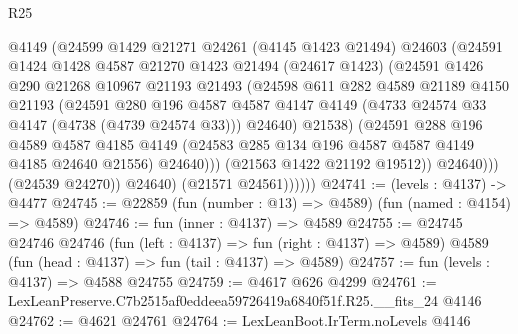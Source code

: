 \begin{lexlean}{R25}
\begin{coremodule}
                        @4149
                        (@24599
                          @1429
                          @21271
                          @24261
                          (@4145 @1423 @21494)
                          @24603
                          (@24591
                            @1424
                            @1428
                            @4587
                            @21270
                            @1423
                            @21494
                            (@24617 @1423)
                            (@24591
                              @1426
                              @290
                              @21268
                              @10967
                              @21193
                              @21493
                              (@24598
                                @611
                                @282
                                @4589
                                @21189
                                @4150
                                @21193
                                (@24591
                                  @280
                                  @196
                                  @4587
                                  @4587
                                  @4147
                                  @4149
                                  (@4733 @24574 @33 @4147 (@4738 (@4739 @24574 @33)))
                                  @24640)
                                @21538)
                              (@24591
                                @288
                                @196
                                @4589
                                @4587
                                @4185
                                @4149
                                (@24583 @285 @134 @196 @4587 @4587 @4149 @4185 @24640 @21556)
                                @24640)))
                          (@21563 @1422 @21192 @19512))
                        @24640)))
                  (@24539 @24270))
                @24640)
              (@21571 @24561))))))
@24741 := (levels : @4137) -> @4477
@24745 := @22859 (fun (number : @13) => @4589) (fun (named : @4154) => @4589)
@24746 := fun (inner : @4137) => @4589
@24755 := @24745
    @24746
    @24746
    (fun (left : @4137) => fun (right : @4137) => @4589)
    @4589
    (fun (head : @4137) => fun (tail : @4137) => @4589)
@24757 := fun (levels : @4137) => @4588 @24755
@24759 := @4617 @626 @4299
@24761 := LexLeanPreserve.C7b2515af0eddeea59726419a6840f51f.R25.__fits_24 @4146
@24762 := @4621 @24761
@24764 := LexLeanBoot.IrTerm.noLevels @4146

\end{coremodule}
\end{lexlean}
